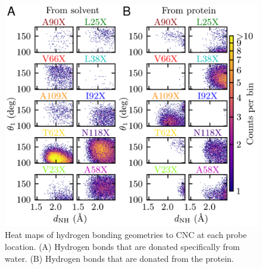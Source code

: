 \begin{figure}
    \center
    \includegraphics[width=\single]{figures-snase/Geometry_combined.png}
    \caption[Heat maps of hydrogen bonding geometries to CNC at each probe location]{
        Heat maps of hydrogen bonding geometries to CNC at each probe location. 
        (A) Hydrogen bonds that are donated specifically from water. 
        (B) Hydrogen bonds that are donated from the protein.
    }
    \label{fig:snase-hbond}
\end{figure}

